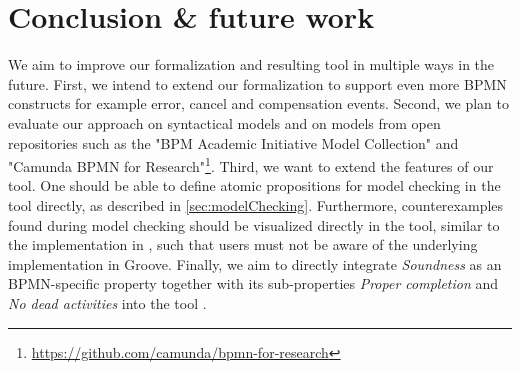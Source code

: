 \documentclass[adraft, copyright, creativecommons]{eptcs} %
\begin{document}
\section{Conclusion \& future work} \label{sec:conclusion}


We aim to improve our formalization and resulting tool in multiple ways in the future.
First, we intend to extend our formalization to support even more BPMN constructs for example error, cancel and compensation events.
Second, we plan to evaluate our approach on syntactical models and on models from open repositories such as the "BPM Academic Initiative Model Collection" \cite{weskeModelCollectionBusiness2020} and "Camunda BPMN for
Research"\footnote{\url{https://github.com/camunda/bpmn-for-research}}.
Third, we want to extend the features of our tool.
One should be able to define atomic propositions for model checking in the tool directly, as described in \cref{sec:modelChecking}.
Furthermore, counterexamples found during model checking should be visualized directly in the tool, similar to the implementation in \cite{houhouFirstOrderLogicVerification2022}, such that users must not be aware of the underlying implementation in Groove.
Finally, we aim to directly integrate \emph{Soundness} as an BPMN-specific property together with its sub-properties \emph{Proper completion} and \emph{No dead activities} into the tool \cite{corradiniClassificationBPMNCollaborations2018}.

\end{document}
